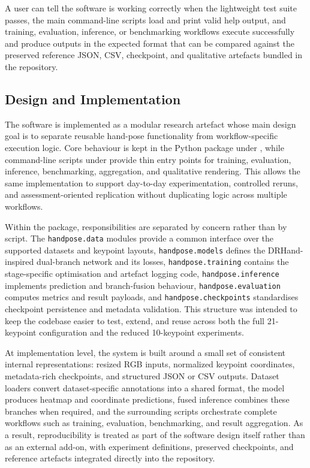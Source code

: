 ﻿\documentclass[11pt,a4paper]{article}
\begin{document}
\medskip

\noindent
A user can tell the software is working correctly when the lightweight test
suite passes, the main command-line scripts load and print valid help output,
and training, evaluation, inference, or benchmarking workflows execute
successfully and produce outputs in the expected format that can be compared
against the preserved reference JSON, CSV, checkpoint, and qualitative
artefacts bundled in the repository.

\subsection{Design and Implementation}

The software is implemented as a modular research artefact whose main design
goal is to separate reusable hand-pose functionality from workflow-specific
execution logic. Core behaviour is kept in the Python package under
, while command-line scripts under  provide
thin entry points for training, evaluation, inference, benchmarking,
aggregation, and qualitative rendering. This allows the same implementation to
support day-to-day experimentation, controlled reruns, and
assessment-oriented replication without duplicating logic across multiple
workflows.

\medskip

\noindent
Within the package, responsibilities are separated by concern rather than by
script. The \texttt{handpose.data} modules provide a common interface over the
supported datasets and keypoint layouts, \texttt{handpose.models} defines the
DRHand-inspired dual-branch network and its losses, \texttt{handpose.training}
contains the stage-specific optimisation and artefact logging code,
\texttt{handpose.inference} implements prediction and branch-fusion behaviour,
\texttt{handpose.evaluation} computes metrics and result payloads, and
\texttt{handpose.checkpoints} standardises checkpoint persistence and metadata
validation. This structure was intended to keep the codebase easier to test,
extend, and reuse across both the full 21-keypoint configuration and the
reduced 10-keypoint experiments.

\medskip

\noindent
At implementation level, the system is built around a small set of consistent
internal representations: resized RGB inputs, normalized keypoint
coordinates, metadata-rich checkpoints, and structured JSON or CSV outputs.
Dataset loaders convert dataset-specific annotations into a shared format, the
model produces heatmap and coordinate predictions, fused inference combines
these branches when required, and the surrounding scripts orchestrate complete
workflows such as training, evaluation, benchmarking, and result aggregation.
As a result, reproducibility is treated as part of the software design itself
rather than as an external add-on, with experiment definitions, preserved
checkpoints, and reference artefacts integrated directly into the repository.
\end{document}
